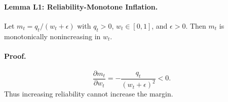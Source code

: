 \paragraph{Lemma L1: Reliability-Monotone Inflation.}
Let \(m_t=q_t/(w_t+\epsilon)\) with \(q_t>0\), \(w_t\in[0,1]\), and
\(\epsilon>0\). Then \(m_t\) is monotonically nonincreasing in \(w_t\).

\paragraph{Proof.}
\[
\frac{\partial m_t}{\partial w_t}
=-\frac{q_t}{(w_t+\epsilon)^2}<0 .
\]
Thus increasing reliability cannot increase the margin.
